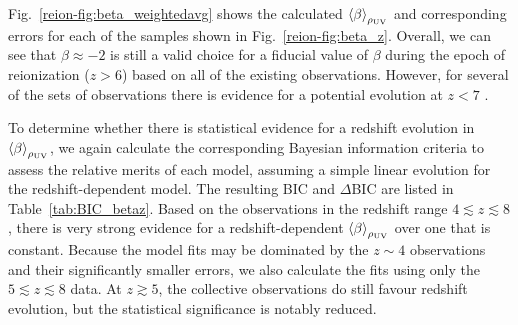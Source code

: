 Fig.~\ref{reion-fig:beta_weightedavg} shows the calculated $\left \langle \beta  \right \rangle_{\rho_{\rm{UV}}}$ and corresponding errors for each of the samples shown in Fig.~\ref{reion-fig:beta_z}. Overall, we can see that $\beta \approx -2$ is still a valid choice for a fiducial value of $\beta$ during the epoch of reionization ($z > 6$) based on all of the existing observations. However, for several of the sets of observations there is evidence for a potential evolution at $z < 7$ \citep{Wilkins:2011fs,Finkelstein:2012hr,Bouwens:2013vf,Duncan:2014gh}. 

To determine whether there is statistical evidence for a redshift evolution in $\left \langle \beta  \right \rangle_{\rho_{\rm{UV}}}$, we again calculate the corresponding Bayesian information criteria to assess the relative merits of each model, assuming a simple linear evolution for the redshift-dependent model. The resulting BIC and $\Delta$BIC are listed in Table~\ref{tab:BIC_betaz}. Based on the observations in the redshift range $4 \lesssim z \lesssim 8$, there is very strong evidence for a redshift-dependent $\left \langle \beta  \right \rangle_{\rho_{\rm{UV}}}$ over one that is constant. Because the model fits may be dominated by the $z\sim 4$ observations and their significantly smaller errors, we also calculate the fits using only the $5 \lesssim z \lesssim 8$ data. At $z \gtrsim 5$, the collective observations do still favour redshift evolution, but the statistical significance is notably reduced.

